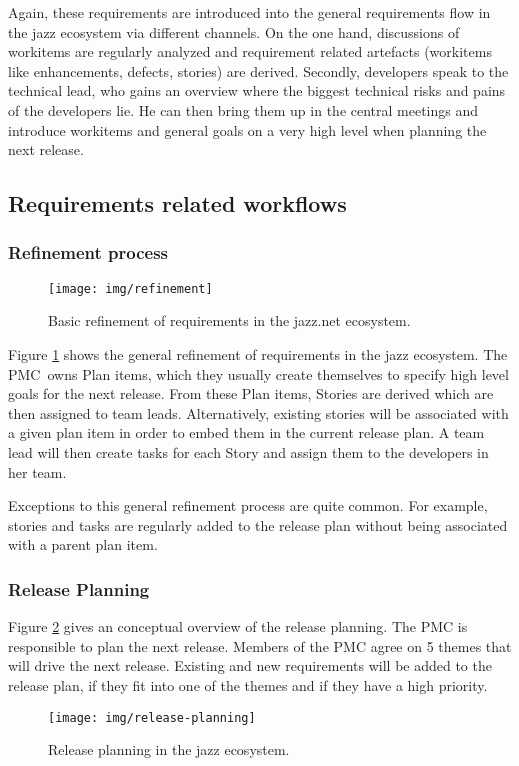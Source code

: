 Again, these requirements are introduced into the general requirements flow in the jazz ecosystem via different channels.
 On the one hand, discussions of workitems are regularly analyzed and requirement related artefacts (workitems like enhancements, defects, stories) are derived. 
 Secondly, developers speak to the technical lead, who gains an overview where the biggest technical risks and pains of the developers lie. 
 He can then bring them up in the central meetings and introduce workitems and general goals on a very high level when planning the next release.

\subsection{Requirements related workflows}
\subsubsection{Refinement process}
\begin{figure}[h]
\begin{center}
\texttt{[image: img/refinement]}
\caption{Basic refinement of requirements in the jazz.net ecosystem.}
\label{fig:refinement}
\end{center}
\end{figure}

Figure \ref{fig:refinement} shows the general refinement of requirements in the jazz ecosystem. 
The PMC\ owns Plan items, which they usually create themselves to specify high level goals for the next release.
From these Plan items, Stories are derived which are then assigned to team leads. 
Alternatively, existing stories will be associated with a given plan item in order to embed them in the current release plan.
A team lead will then create tasks for each Story and assign them to the developers in her team.

Exceptions to this general refinement process are quite common.
For example, stories and tasks are regularly added to the release plan without being associated with a parent plan item.

\subsubsection{Release Planning}
Figure \ref{fig:release-planning} gives an conceptual overview of the release planning.
The PMC is responsible to plan the next release.
Members of the PMC agree on 5 themes that will drive the next release.
Existing and new requirements will be added to the release plan, if they fit into one of the themes and if they have a high priority.
\begin{figure}[h]
\begin{center}
\texttt{[image: img/release-planning]}
\caption{Release planning in the jazz ecosystem.}
\label{fig:release-planning}
\end{center}
\end{figure}

